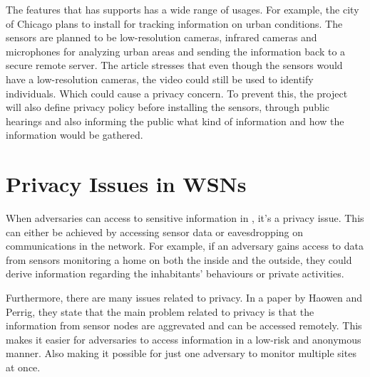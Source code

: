 

The features that \wsn has supports has a wide range of usages. For example, the city of Chicago plans to install \wsn for tracking information on urban conditions. The sensors are planned to be low-resolution cameras, infrared cameras and microphones for analyzing urban areas and sending the information back to a secure remote server. The article stresses that even though the sensors would have a low-resolution cameras, the video could still be used to identify individuals. Which could cause a privacy concern. To prevent this, the project will also define privacy policy before installing the sensors, through public hearings and also informing the public what kind of information and how the information would be gathered.




\section{Privacy Issues in WSNs}



When adversaries can access to sensitive information in \wsn, it's a privacy issue. This can either be achieved by accessing sensor data or eavesdropping on communications in the network. For example, if an adversary gains access to data from sensors monitoring a home on both the inside and the outside, they could derive information regarding the inhabitants' behaviours or private activities. 

Furthermore, there are many issues related to privacy. In a paper by Haowen and Perrig\cite{chan2003security}, they state that the main problem related to privacy is that the information from sensor nodes are aggrevated and can be accessed remotely. This makes it easier for adversaries to access information in a low-risk and anonymous manner. Also making it possible for just one adversary to monitor multiple sites at once. 

